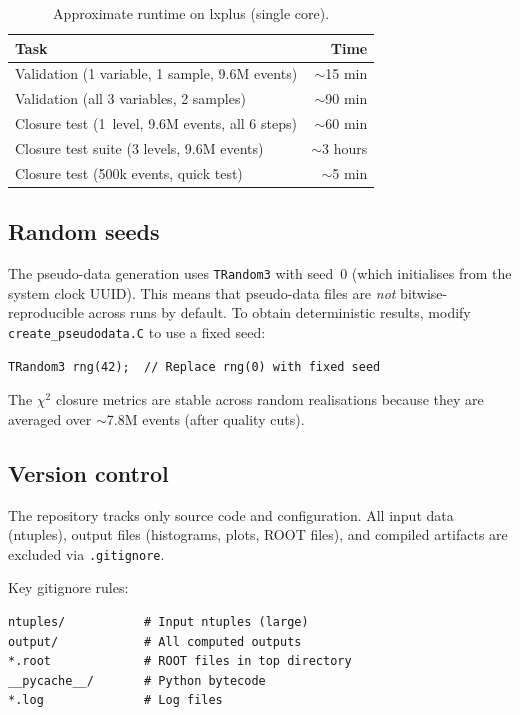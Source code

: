 \documentclass[12pt,a4paper]{article}
\begin{document}
\begin{table}[htbp]
\centering
\caption{Approximate runtime on lxplus (single core).}
\label{tab:runtime}
\begin{tabular}{lr}
\toprule
\textbf{Task} & \textbf{Time} \\
\midrule
Validation (1 variable, 1 sample, 9.6M events) & $\sim$15 min \\
Validation (all 3 variables, 2 samples) & $\sim$90 min \\
Closure test (1~level, 9.6M events, all 6 steps) & $\sim$60 min \\
Closure test suite (3 levels, 9.6M events) & $\sim$3 hours \\
Closure test (500k events, quick test) & $\sim$5 min \\
\bottomrule
\end{tabular}
\end{table}

\subsection{Random seeds}

The pseudo-data generation uses \texttt{TRandom3} with seed~0 (which
initialises from the system clock UUID). This means that pseudo-data
files are \emph{not} bitwise-reproducible across runs by default. To
obtain deterministic results, modify \texttt{create\_pseudodata.C} to
use a fixed seed:

\begin{lstlisting}[style=cppstyle]
TRandom3 rng(42);  // Replace rng(0) with fixed seed
\end{lstlisting}

The $\chi^2$ closure metrics are stable across random realisations
because they are averaged over $\sim$7.8M events (after quality cuts).

\subsection{Version control}

The repository tracks only source code and configuration. All input
data (ntuples), output files (histograms, plots, ROOT files), and
compiled artifacts are excluded via \texttt{.gitignore}.

Key gitignore rules:
\begin{lstlisting}
ntuples/           # Input ntuples (large)
output/            # All computed outputs
*.root             # ROOT files in top directory
__pycache__/       # Python bytecode
*.log              # Log files
\end{lstlisting}
\end{document}
